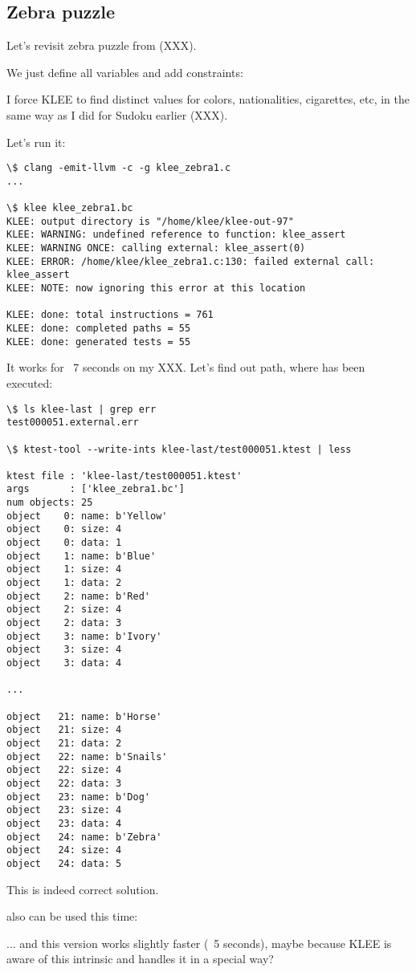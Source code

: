 \subsection{Zebra puzzle}

Let's revisit zebra puzzle from (XXX). %

We just define all variables and add constraints:



I force KLEE to find distinct values for colors, nationalities, cigarettes, etc, in the same way as I did for Sudoku earlier (XXX). %

Let's run it:

\begin{lstlisting}
\$ clang -emit-llvm -c -g klee_zebra1.c
...

\$ klee klee_zebra1.bc
KLEE: output directory is "/home/klee/klee-out-97"
KLEE: WARNING: undefined reference to function: klee_assert
KLEE: WARNING ONCE: calling external: klee_assert(0)
KLEE: ERROR: /home/klee/klee_zebra1.c:130: failed external call: klee_assert
KLEE: NOTE: now ignoring this error at this location

KLEE: done: total instructions = 761
KLEE: done: completed paths = 55
KLEE: done: generated tests = 55
\end{lstlisting}

It works for ~7 seconds on my XXX.
Let's find out path, where  has been executed:

\begin{lstlisting}
\$ ls klee-last | grep err
test000051.external.err

\$ ktest-tool --write-ints klee-last/test000051.ktest | less

ktest file : 'klee-last/test000051.ktest'
args       : ['klee_zebra1.bc']
num objects: 25
object    0: name: b'Yellow'
object    0: size: 4
object    0: data: 1
object    1: name: b'Blue'
object    1: size: 4
object    1: data: 2
object    2: name: b'Red'
object    2: size: 4
object    2: data: 3
object    3: name: b'Ivory'
object    3: size: 4
object    3: data: 4

...

object   21: name: b'Horse'
object   21: size: 4
object   21: data: 2
object   22: name: b'Snails'
object   22: size: 4
object   22: data: 3
object   23: name: b'Dog'
object   23: size: 4
object   23: data: 4
object   24: name: b'Zebra'
object   24: size: 4
object   24: data: 5
\end{lstlisting}

This is indeed correct solution.

 also can be used this time:



... and this version works slightly faster (~5 seconds), %
maybe because KLEE is aware of this intrinsic and handles it in a special way?

